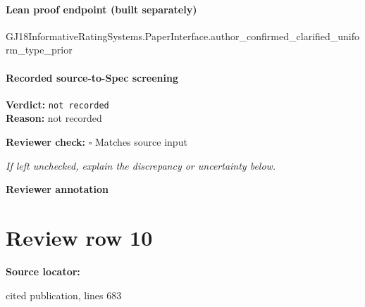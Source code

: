 \documentclass[10pt]{article}
\newcommand{\reviewerbox}{%
  \par\noindent\fbox{\parbox{0.96\linewidth}{\rule{0pt}{0.38in}}}\par
}
\newcommand{\reviewmatch}[1]{%
  \par\noindent\textbf{Reviewer check:} $\square$\; #1\par
  \noindent\emph{If left unchecked, explain the discrepancy or uncertainty below.}\par
}
\begin{document}
\paragraph{Lean proof endpoint (built separately)}\begin{ReviewVerbatim}
GJ18InformativeRatingSystems.PaperInterface.author_confirmed_clarified_uniform_type_prior
\end{ReviewVerbatim}

\paragraph{Recorded source-to-Spec screening}
\textbf{Verdict:} \texttt{not recorded}
\\
\textbf{Reason:} not recorded
\reviewmatch{Matches source input}
\noindent\textbf{Reviewer annotation}\par
\reviewerbox
\clearpage
\hypertarget{source-claim-698b53d20aef3ea2}{}
\section*{Review row 10}
\textbf{Source locator:} {\footnotesize\raggedright cited publication, lines 683\par}
\end{document}

